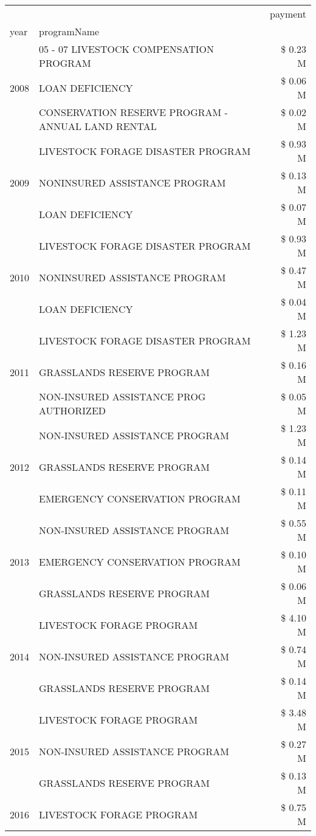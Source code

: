 \begin{tabular}{llr}
\toprule
 &  & payment \\
year & programName &  \\
\midrule
\multirow[t]{3}{*}{2008} & 05 - 07 LIVESTOCK COMPENSATION PROGRAM & \$ 0.23 M \\
 & LOAN DEFICIENCY & \$ 0.06 M \\
 & CONSERVATION RESERVE PROGRAM - ANNUAL LAND RENTAL & \$ 0.02 M \\
\cline{1-3}
\multirow[t]{3}{*}{2009} & LIVESTOCK FORAGE DISASTER  PROGRAM & \$ 0.93 M \\
 & NONINSURED ASSISTANCE PROGRAM & \$ 0.13 M \\
 & LOAN DEFICIENCY & \$ 0.07 M \\
\cline{1-3}
\multirow[t]{3}{*}{2010} & LIVESTOCK FORAGE DISASTER  PROGRAM & \$ 0.93 M \\
 & NONINSURED ASSISTANCE PROGRAM & \$ 0.47 M \\
 & LOAN DEFICIENCY & \$ 0.04 M \\
\cline{1-3}
\multirow[t]{3}{*}{2011} & LIVESTOCK FORAGE DISASTER PROGRAM & \$ 1.23 M \\
 & GRASSLANDS RESERVE PROGRAM & \$ 0.16 M \\
 & NON-INSURED ASSISTANCE PROG AUTHORIZED & \$ 0.05 M \\
\cline{1-3}
\multirow[t]{3}{*}{2012} & NON-INSURED ASSISTANCE PROGRAM & \$ 1.23 M \\
 & GRASSLANDS RESERVE PROGRAM & \$ 0.14 M \\
 & EMERGENCY CONSERVATION PROGRAM & \$ 0.11 M \\
\cline{1-3}
\multirow[t]{3}{*}{2013} & NON-INSURED ASSISTANCE PROGRAM & \$ 0.55 M \\
 & EMERGENCY CONSERVATION PROGRAM & \$ 0.10 M \\
 & GRASSLANDS RESERVE PROGRAM & \$ 0.06 M \\
\cline{1-3}
\multirow[t]{3}{*}{2014} & LIVESTOCK FORAGE PROGRAM & \$ 4.10 M \\
 & NON-INSURED ASSISTANCE PROGRAM & \$ 0.74 M \\
 & GRASSLANDS RESERVE PROGRAM & \$ 0.14 M \\
\cline{1-3}
\multirow[t]{3}{*}{2015} & LIVESTOCK FORAGE PROGRAM & \$ 3.48 M \\
 & NON-INSURED ASSISTANCE PROGRAM & \$ 0.27 M \\
 & GRASSLANDS RESERVE PROGRAM & \$ 0.13 M \\
\cline{1-3}
\multirow[t]{3}{*}{2016} & LIVESTOCK FORAGE PROGRAM & \$ 0.75 M \\

\end{tabular}
